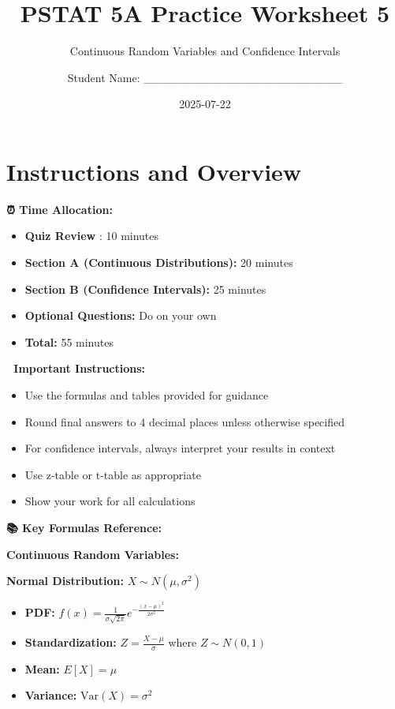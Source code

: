 \documentclass[
  11pt,
]{article}
\title{PSTAT 5A Practice Worksheet 5}
\subtitle{Continuous Random Variables and Confidence Intervals}
\author{Student Name: \_\_\_\_\_\_\_\_\_\_\_\_\_\_\_\_\_\_\_\_\_\_\_\_}
\date{2025-07-22}
\providecommand{\tightlist}{%
  \setlength{\itemsep}{0pt}\setlength{\parskip}{0pt}}\usepackage{longtable,booktabs,array}
\renewcommand*\contentsname{Table of contents}
\newcommand\contentsname{Table of contents}
\begin{document}
\maketitle

\renewcommand*\contentsname{Table of contents}
{
\hypersetup{linkcolor=}
\setcounter{tocdepth}{3}
\tableofcontents
}

\section{Instructions and Overview}\label{instructions-and-overview}

\textbf{⏰ Time Allocation:}

\begin{itemize}
\item
  \textbf{Quiz Review} : 10 minutes
\item
  \textbf{Section A (Continuous Distributions):} 20 minutes
\item
  \textbf{Section B (Confidence Intervals):} 25 minutes
\item
  \textbf{Optional Questions:} Do on your own
\item
  \textbf{Total:} 55 minutes
\end{itemize}

\textbf{📝 Important Instructions:}

\begin{itemize}
\item
  Use the formulas and tables provided for guidance
\item
  Round final answers to 4 decimal places unless otherwise specified
\item
  For confidence intervals, always interpret your results in context
\item
  Use z-table or t-table as appropriate
\item
  Show your work for all calculations
\end{itemize}

\textbf{📚 Key Formulas Reference:}

\textbf{Continuous Random Variables:}

\textbf{Normal Distribution:} \(X \sim N(\mu, \sigma^2)\)

\begin{itemize}
\tightlist
\item
  \textbf{PDF:}
  \(f(x) = \frac{1}{\sigma\sqrt{2\pi}} e^{-\frac{(x-\mu)^2}{2\sigma^2}}\)
\item
  \textbf{Standardization:} \(Z = \frac{X - \mu}{\sigma}\) where
  \(Z \sim N(0,1)\)
\item
  \textbf{Mean:} \(E[X] = \mu\)
\item
  \textbf{Variance:} \(\text{Var}(X) = \sigma^2\)
\end{itemize}
\end{document}
